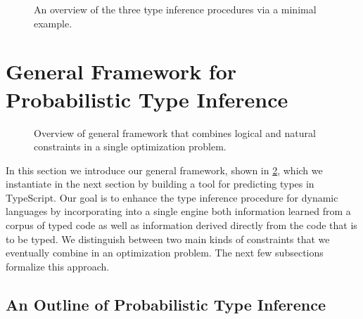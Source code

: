 \documentclass[sigplan,10pt,review,anonymous]{acmart}
\theoremstyle{plain}
\theoremstyle{remark}
\theoremstyle{definition}
\begin{document}
\begin{figure}[!t]
    \centering
    \def\svgwidth{0.95\linewidth}
    \caption{An overview of the three type inference procedures via a minimal example.}\label{fig:fullexample}
\end{figure}

\section{General Framework for Probabilistic Type Inference} \label{sec:framework}

\begin{figure}[!t]
    \centering
    \def\svgwidth{\linewidth}
    \caption{Overview of general framework that combines logical
    and natural constraints in a single optimization problem.} \label{fig:overview}
\end{figure}


In this section we introduce our general framework, shown in \cref{fig:overview}, 
which we instantiate in the next section by building a tool for 
predicting types in TypeScript.
%
Our goal is to enhance the type inference
procedure for dynamic languages by incorporating into a single engine
both information learned from a corpus of typed code
as well as information derived directly from the code that is to be typed.
%
We distinguish between two main kinds of constraints that we eventually 
combine in an optimization problem.
The next few subsections formalize this approach.

\subsection{An Outline of Probabilistic Type Inference}
\end{document}
